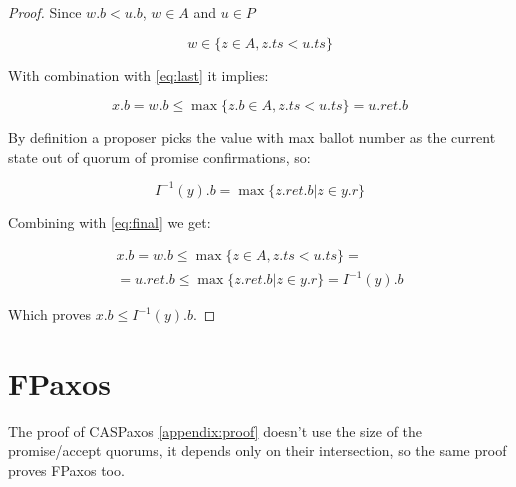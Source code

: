 \documentclass[12pt]{article}
\theoremstyle{definition}
\begin{document}
\begin{appendices}
\begin{proof}
  Since $w.b < u.b$, $w \in A$ and $u \in P$

  \begin{equation}
    w \in \{ z \in A, z.ts < u.ts \}
  \end{equation}

  With combination with \ref{eq:last} it implies:

  \begin{equation} \label{eq:final}
    x.b = w.b \leq \max \{ z.b \in A, z.ts < u.ts \} = u.ret.b
  \end{equation}

  By definition a proposer picks the value with max ballot number as the current state out of quorum of promise confirmations, so:

  \begin{equation}
    I^{-1}(y).b = \max \{ z.ret.b | z \in y.r \}
  \end{equation}

  Combining with \ref{eq:final} we get:

  \begin{multline}
    x.b = w.b \leq \max \{ z \in A, z.ts < u.ts \} = \\
    = u.ret.b \leq \max \{ z.ret.b | z \in y.r \} = I^{-1}(y).b
  \end{multline}

  Which proves $x.b \leq I^{-1}(y).b$.

\end{proof}

\section{FPaxos}
\label{appendix:fpaxos}
The proof of CASPaxos \ref{appendix:proof} doesn't use the size of the promise/accept quorums, it depends only on their intersection, so the same proof proves FPaxos too.

\end{appendices}
\end{document}
